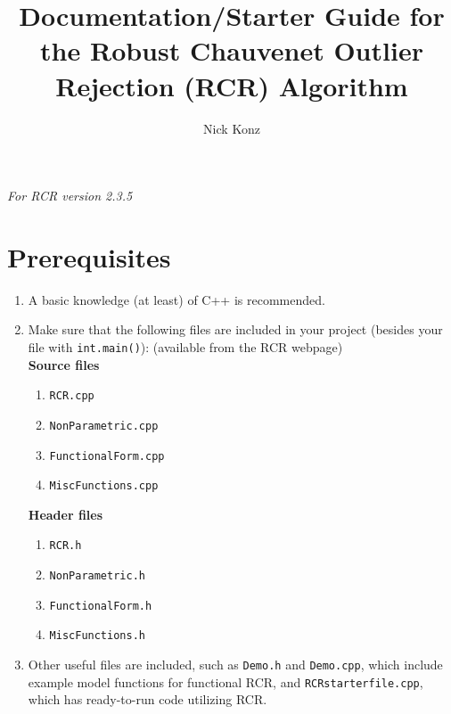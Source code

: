 \documentclass[12pt]{article}
\author{Nick Konz}
\title{Documentation/Starter Guide for the Robust Chauvenet Outlier Rejection (RCR) Algorithm}
\begin{document}
	
\maketitle
\textit{For RCR version 2.3.5}
\section*{Prerequisites}
\begin{enumerate}
	\item A basic knowledge (at least) of C++ is recommended.
	\item Make sure that the following files are included in your project (besides your file with \texttt{int.main()}): (available from the RCR webpage)
	\\\textbf{Source files}
	\begin{enumerate}
		\item \texttt{RCR.cpp}
		\item \texttt{NonParametric.cpp}
		\item \texttt{FunctionalForm.cpp}
		\item \texttt{MiscFunctions.cpp}
	\end{enumerate}
	\textbf{Header files}
	\begin{enumerate}
		\item \texttt{RCR.h}
		\item \texttt{NonParametric.h}
		\item \texttt{FunctionalForm.h}
		\item \texttt{MiscFunctions.h}
	\end{enumerate}
	\item Other useful files are included, such as \texttt{Demo.h} and \texttt{Demo.cpp}, which include example model functions for functional RCR, and \texttt{RCRstarterfile.cpp}, which has ready-to-run code utilizing RCR.
\end{enumerate}
\end{document}
